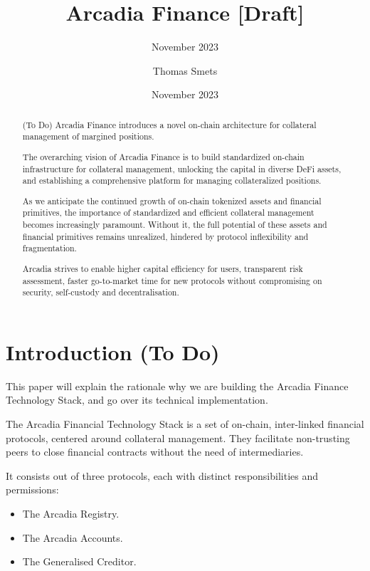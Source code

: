 \documentclass[sigconf,nonacm]{acmart}
\title{Arcadia Finance [Draft]}
\subtitle{November 2023}
\date{November 2023}
\author{Thomas Smets}
\affiliation{
    \institution{Arcadia Finance}
    \city{Brussels}
    \country{Belgium}
}
\begin{document}
\begin{abstract}
    (To Do)
    Arcadia Finance introduces a novel on-chain architecture for collateral management of margined positions.

    The overarching vision of Arcadia Finance is to build standardized on-chain infrastructure for collateral management,
    unlocking the capital in diverse DeFi assets, and establishing a comprehensive platform for managing collateralized positions. 

    As we anticipate the continued growth of on-chain tokenized assets and financial primitives, the importance of standardized and efficient collateral management becomes increasingly paramount.
    Without it, the full potential of these assets and financial primitives remains unrealized, hindered by protocol inflexibility and fragmentation.

    Arcadia strives to enable higher capital efficiency for users, transparent risk assessment, faster go-to-market time for new protocols without compromising on security, self-custody and decentralisation.
\end{abstract}


\maketitle

\section{Introduction (To Do)} 
\label{sec:introduction}
This paper will explain the rationale why we are building the Arcadia Finance Technology Stack, and go over its technical implementation.

The Arcadia Financial Technology Stack is a set of on-chain, inter-linked financial protocols, centered around collateral management.
They facilitate non-trusting peers to close financial contracts without the need of intermediaries.

It consists out of three protocols, each with distinct responsibilities and permissions:
\begin{itemize}
\item The Arcadia Registry.
\item The Arcadia Accounts.
\item The Generalised Creditor.
\end{itemize}
\end{document}
